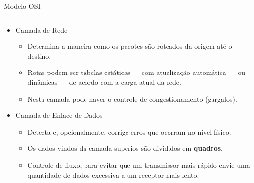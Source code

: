 \documentclass{libs/ufc_format}
\begin{document}
\begin{frame}{Modelo OSI}
\begin{columns}
        \begin{column}{0.65\textwidth}
            \begin{itemize}
                \item Camada de Rede
                    \begin{itemize}
                        \justifying
                        \item<2> Determina a maneira como os pacotes são roteados da origem até o destino.
                        \item<2> Rotas podem ser tabelas estáticas --- com atualização automática --- ou dinâmicas --- de acordo com a carga atual da rede.
                        \item<2> Nesta camada pode haver o controle de congestionamento (gargalos).
                    \end{itemize}
                \item<3-> Camada de Enlace de Dados
                    \begin{itemize}
                        \justifying
                        \item<4> Detecta e, opcionalmente, corrige erros que ocorram no nível físico.
                        \item<4> Os dados vindos da camada superios são divididos em \textbf{quadros}.
                        \item<4> Controle de fluxo, para evitar que um transmissor mais rápido envie uma quantidade de dados excessiva a um receptor mais lento.
                    \end{itemize}
            \end{itemize}
        \end{column}
    \end{columns}
\end{frame}
\end{document}
